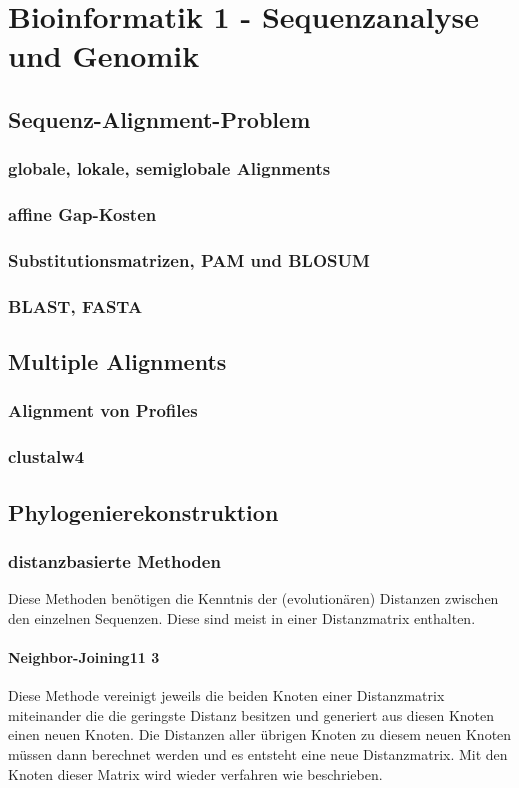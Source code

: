 \documentclass[%
   final,      %
   paper=a4,%
   paper=portrait, %
   pagesize=auto, %
   fontsize=11pt,%
 ]{scrreprt} %
\begin{document}
\chapter{Bioinformatik 1 - Sequenzanalyse und Genomik}
\section{Sequenz-Alignment-Problem}
\subsection{globale, lokale, semiglobale Alignments}
\subsection{affine Gap-Kosten}
\subsection{Substitutionsmatrizen, PAM und BLOSUM}
\subsection{BLAST, FASTA}

\section{Multiple Alignments}
\subsection{Alignment von Profiles}
\subsection{clustalw4}

\section{Phylogenierekonstruktion}
\subsection{distanzbasierte Methoden}
Diese Methoden benötigen die Kenntnis der (evolutionären) Distanzen zwischen den einzelnen Sequenzen. Diese sind meist in einer Distanzmatrix enthalten.
\subsubsection{Neighbor-Joining11 3}
Diese Methode vereinigt jeweils die beiden Knoten einer Distanzmatrix miteinander die die geringste Distanz besitzen und generiert aus diesen Knoten einen neuen Knoten. Die Distanzen aller übrigen Knoten zu diesem neuen Knoten müssen dann berechnet werden und es entsteht eine neue Distanzmatrix. Mit den Knoten dieser Matrix wird wieder verfahren wie beschrieben.
\end{document}
